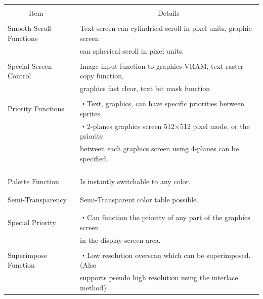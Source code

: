 \documentclass[twoside,a4paper,12pt]{article}
\begin{document}
\setlength{\tabcolsep}{0.5mm}
\begin{tabular}{|p{44mm}|p{123mm}|}
\hline
&\\[-2mm]
\ \ \ \ \ \ Item & \ \ \ \ \ \ \ \ \ \ \ \ \ \ \ \ \ \ \ \ \ \ Details\\[4mm]
\hline
&\\[-3mm]
Smooth Scroll Functions & Text screen can cylindrical scroll in pixel units, graphic screen\\
& can spherical scroll in pixel units.\\
\hline
&\\[-3mm]
Special Screen Control & Image input function to graphics VRAM, text raster copy function,\\
& graphics fast clear, text bit mask function\\
\hline
&\\[-3mm]
Priority Functions & ・Text, graphics, can have specific priorities between sprites.\\
& ・2-planes graphics screen 512×512 pixel mode, or the priority\\
& between each graphics screen using 4-planes can be specified.\\
&\\
&\\
&\\
\hline
&\\[-3mm]
Palette Function & Is instantly switchable to any color.\\
&\\
\hline
&\\[-3mm]
Semi-Transparency & Semi-Transparent color table possible.\\
&\\
\hline
&\\[-3mm]
Special Priority & ・Can function the priority of any part of the graphics screen\\
& in the display screen area.\\
\hline
&\\[-3mm]
Superimpose Function & ・Low resolution overscan which can be superimposed. (Also\\
& supports pseudo high resolution using the interlace method)\\
\hline
\end{tabular}\\[1mm]
\end{document}
